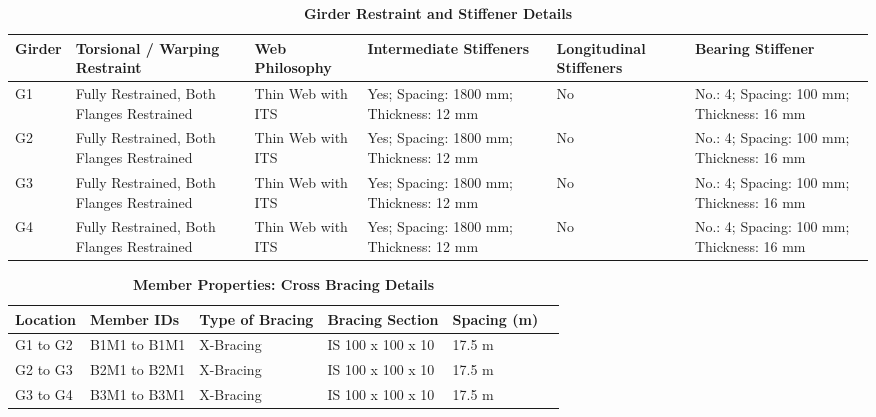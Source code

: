 \documentclass[12pt,a4paper]{report}
\numberwithin{table}{chapter}
\numberwithin{figure}{chapter}
\begin{document}
\vspace{4pt}
\begin{longtable}{|L{1.4cm}|p{2.2cm}|p{2.2cm}|p{3.0cm}|p{2.4cm}|p{2.2cm}|}
\caption{\textbf{Girder Restraint and Stiffener Details}}\\
\hline
\textbf{Girder} & \textbf{Torsional / Warping Restraint} & \textbf{Web Philosophy} & \textbf{Intermediate Stiffeners} & \textbf{Longitudinal Stiffeners} & \textbf{Bearing Stiffener} \\[6pt]
\hline
\endfirsthead
\endhead

G1 & Fully Restrained, Both Flanges Restrained & Thin Web with ITS & Yes; Spacing: 1800 mm; Thickness: 12 mm & No & No.: 4; Spacing: 100 mm; Thickness: 16 mm \\[8pt]
\hline
G2 & Fully Restrained, Both Flanges Restrained & Thin Web with ITS & Yes; Spacing: 1800 mm; Thickness: 12 mm & No & No.: 4; Spacing: 100 mm; Thickness: 16 mm \\[8pt]
\hline
G3 & Fully Restrained, Both Flanges Restrained & Thin Web with ITS & Yes; Spacing: 1800 mm; Thickness: 12 mm & No & No.: 4; Spacing: 100 mm; Thickness: 16 mm \\[8pt]
\hline
G4 & Fully Restrained, Both Flanges Restrained & Thin Web with ITS & Yes; Spacing: 1800 mm; Thickness: 12 mm & No & No.: 4; Spacing: 100 mm; Thickness: 16 mm \\[8pt]
\hline
\end{longtable}



\newpage

\vspace{0.4em}
\setlength{\tabcolsep}{4pt}
\setlength\LTleft{0pt}
\setlength\LTright{\fill}

\begin{longtable}{|L{2.2cm}|L{2.2cm}|L{3.0cm}|L{2.5cm}|C{1.8cm}|C{1.8cm}|}
\caption{\textbf{Member Properties: Cross Bracing Details}}
\hline
\textbf{Location} & \textbf{Member IDs} & \textbf{Type of Bracing} & \textbf{Bracing Section} & \textbf{Spacing (m)} \\
\hline
G1 to G2 & B1M1 to B1M1 & X-Bracing & IS 100 x 100 x 10 & 17.5 m \\[6pt]
\hline
G2 to G3 & B2M1 to B2M1 & X-Bracing & IS 100 x 100 x 10 & 17.5 m \\[6pt]
\hline
G3 to G4 & B3M1 to B3M1 & X-Bracing & IS 100 x 100 x 10 & 17.5 m \\[6pt]
\hline
\end{longtable}

\vspace{0.4em}
\noindent
\setlength{\tabcolsep}{4pt}
\setlength\LTleft{0pt}
\setlength\LTright{\fill}
\end{document}
